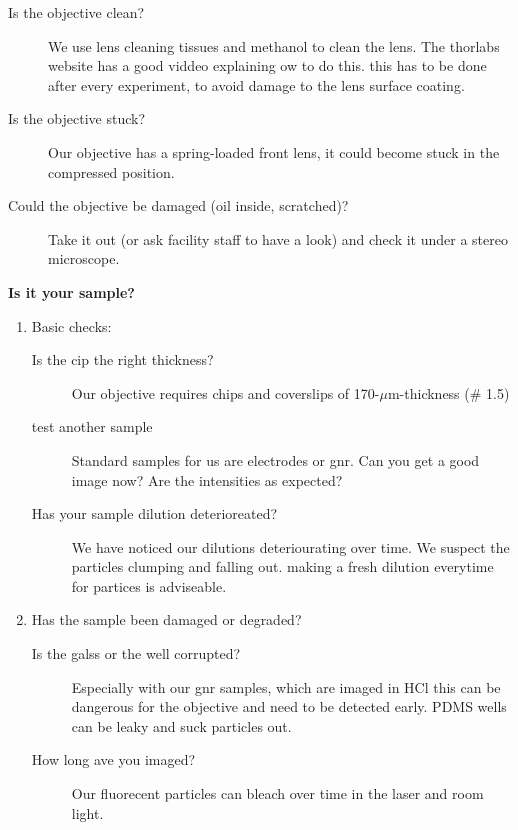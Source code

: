 \begin{description}
\begin{enumerate}
\begin{description}
			\item[Is the objective clean?] We use lens cleaning tissues and methanol to clean the lens. The thorlabs website has a good viddeo explaining ow to do this\cite{Thorlabs2025OpticsHandling}. this has to be done after every experiment, to avoid damage to the lens surface coating. 
			\item[Is the objective stuck?] Our objective has a spring-loaded front lens, it could become stuck in the compressed position. 
			\item[Could the objective be damaged (oil inside, scratched)? ] Take it out (or ask facility staff to have a look) and check it under a stereo microscope.
		\end{description}
	\end{enumerate}
	\item \textbf{Is it your sample?}
	\begin{enumerate}
		\item Basic checks:
		\begin{description}
			\item[Is the cip the right thickness?] Our objective requires chips and coverslips of 170-$\mu$m-thickness (\# 1.5)
			\item[test another sample] Standard samples for us are electrodes or \gls{gnr}. Can you get a good image now? Are the intensities as expected?
			\item[Has your sample dilution deterioreated?] We have noticed our dilutions deteriourating over time. We suspect the particles clumping and falling out. making a fresh dilution everytime for partices is adviseable.
		\end{description}
		\item Has the sample been damaged or degraded?
		\begin{description}
			\item[Is the galss or the well corrupted?] Especially with our \gls{gnr} samples, which are imaged in HCl this can be dangerous for the objective and need to be detected early. PDMS wells can be leaky and suck particles out. 
			\item[How long ave you imaged?] Our fluorecent particles can bleach over time in the laser and room light. 
		\end{description}
	\end{enumerate}
\end{description}